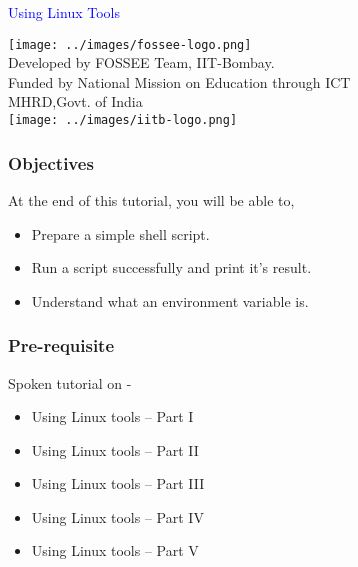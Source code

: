 \documentclass[12pt,compress]{beamer}
\begin{document}
\begin{frame}

\begin{center}
\vspace{12pt}
\textcolor{blue}{\huge Using Linux Tools}
\end{center}
\vspace{18pt}
\begin{center}
\vspace{10pt}
\texttt{[image: ../images/fossee-logo.png]}\\
\vspace{5pt}
\scriptsize Developed by FOSSEE Team, IIT-Bombay. \\ 
\scriptsize Funded by National Mission on Education through ICT\\
\scriptsize  MHRD,Govt. of India\\
\texttt{[image: ../images/iitb-logo.png]}\\
\end{center}
\end{frame}
\begin{frame}
\frametitle{Objectives}
\label{sec-2}

At the end of this tutorial, you will be able to,
\begin{itemize}
\item Prepare a simple shell script. 
\item Run a script successfully and print it's result.
\item Understand what an environment variable is.
\end{itemize}
\end{frame}

\begin{frame}
\frametitle{Pre-requisite}
\label{sec-3}

Spoken tutorial on -
\begin{itemize}
\item Using Linux tools -- Part I
\item Using Linux tools -- Part II
\item Using Linux tools -- Part III
\item Using Linux tools -- Part IV
\item Using Linux tools -- Part V
\end{itemize}
\end{frame}
\end{document}
